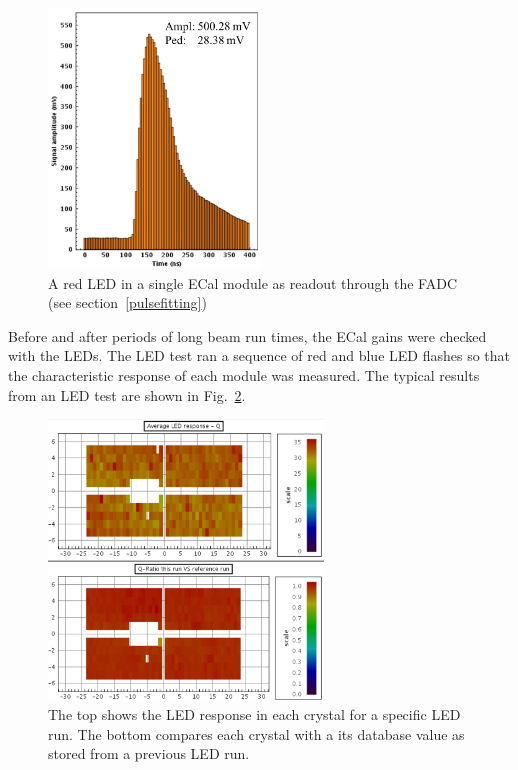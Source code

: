 \begin{figure}[htb]
  \centering
      \includegraphics[width=0.5\textwidth]{pics/experiment/ledSignal.png}
  \caption[LED signal in ECal FADC]{A red LED in a single ECal module as readout through the FADC (see section~\ref{pulsefitting})}
  \label{Figure:redSignal}
\end{figure}

Before and after periods of long beam run times, the ECal gains were checked with the LEDs. The LED test ran a sequence of red and blue LED flashes so that the characteristic response of each module was measured. The typical results from an LED test are shown in Fig.~\ref{Figure:redCompare}.

\begin{figure}[htb]
  \centering
      \includegraphics[width=0.65\textwidth]{pics/experiment/ledCompare.png}
  \caption[Results of a single LED run]{The top shows the LED response in each crystal for a specific LED run. The bottom compares each crystal with a its database value as stored from a previous LED run.}
  \label{Figure:redCompare}
\end{figure}

